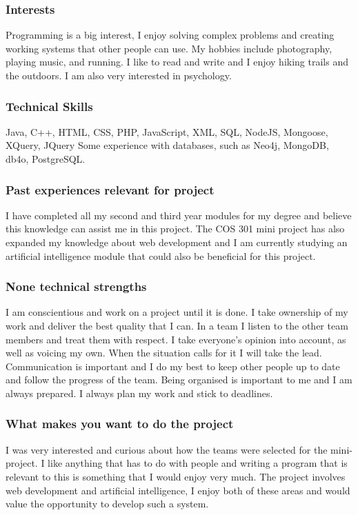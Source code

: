 \documentclass[hidelinks, 12pt, oneside]{article}
\begin{document}
\subsubsection{Interests}
Programming is a big interest, I enjoy solving complex problems and creating working systems that other people can use. My hobbies include photography, playing music, and running. I like to read and write and I enjoy hiking trails and the outdoors. I am also very interested in psychology. 
\subsubsection{Technical Skills}
Java, C++, HTML, CSS, PHP, JavaScript, XML, SQL, NodeJS, Mongoose, XQuery, JQuery
Some experience with databases, such as Neo4j, MongoDB, db4o, PostgreSQL.
\subsubsection{Past experiences relevant for project}
I have completed all my second and third year modules for my degree and believe this knowledge can assist me in this project. The COS 301 mini project has also expanded my knowledge about web development and I am currently studying an artificial intelligence module that could also be beneficial for this project.
\subsubsection{None technical strengths}
I am conscientious and work on a project until it is done. I take ownership of my work and deliver the best quality that I can. In a team I listen to the other team members and treat them with respect. I take everyone’s opinion into account, as well as voicing my own. When the situation calls for it I will take the lead. Communication is important and I do my best to keep other people up to date and follow the progress of the team. Being organised is important to me and I am always prepared. I always plan my work and stick to deadlines.
\subsubsection{What makes you want to do the project}
I was very interested and curious about how the teams were selected for the mini-project. I like anything that has to do with people and writing a program that is relevant to this is something that I would enjoy very much. The project involves web development and artificial intelligence, I enjoy both of these areas and would value the opportunity to develop such a system.
\end{document}
